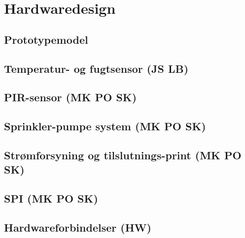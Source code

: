 \chapter{Hardwaredesign}

\section{Prototypemodel}


\section{Temperatur- og fugtsensor (JS LB)}


\section{PIR-sensor (MK PO SK)}


\section{Sprinkler-pumpe system (MK PO SK)}


\section{Strømforsyning og tilslutnings-print (MK PO SK)}


\section{SPI (MK PO SK)}


\section{Hardwareforbindelser (HW)}

